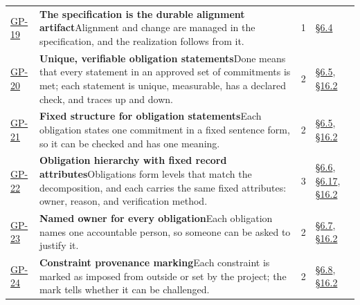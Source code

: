 \begin{longtable}{@{}p{} p{} r p{}@{}}
\hyperlink{gp-19}{GP-19}\hypertarget{gp-19}{} & \textbf{The specification is the durable alignment artifact}\newline Alignment and change are managed in the specification, and the realization follows from it.\rule[-\normalbaselineskip]{0pt}{0pt} & 1 & \hyperlink{nss-6.4}{\S6.4}\rule[-\normalbaselineskip]{0pt}{0pt} \\
\hyperlink{gp-20}{GP-20}\hypertarget{gp-20}{} & \textbf{Unique, verifiable obligation statements}\newline Done means that every statement in an approved set of commitments is met; each statement is unique, measurable, has a declared check, and traces up and down.\rule[-\normalbaselineskip]{0pt}{0pt} & 2 & \hyperlink{nss-6.5}{\S6.5}, \hyperlink{nss-16.2}{\S16.2}\rule[-\normalbaselineskip]{0pt}{0pt} \\
\hyperlink{gp-21}{GP-21}\hypertarget{gp-21}{} & \textbf{Fixed structure for obligation statements}\newline Each obligation states one commitment in a fixed sentence form, so it can be checked and has one meaning.\rule[-\normalbaselineskip]{0pt}{0pt} & 2 & \hyperlink{nss-6.5}{\S6.5}, \hyperlink{nss-16.2}{\S16.2}\rule[-\normalbaselineskip]{0pt}{0pt} \\
\hyperlink{gp-22}{GP-22}\hypertarget{gp-22}{} & \textbf{Obligation hierarchy with fixed record attributes}\newline Obligations form levels that match the decomposition, and each carries the same fixed attributes: owner, reason, and verification method.\rule[-\normalbaselineskip]{0pt}{0pt} & 3 & \hyperlink{nss-6.6}{\S6.6}, \hyperlink{nss-6.17}{\S6.17}, \hyperlink{nss-16.2}{\S16.2}\rule[-\normalbaselineskip]{0pt}{0pt} \\
\hyperlink{gp-23}{GP-23}\hypertarget{gp-23}{} & \textbf{Named owner for every obligation}\newline Each obligation names one accountable person, so someone can be asked to justify it.\rule[-\normalbaselineskip]{0pt}{0pt} & 2 & \hyperlink{nss-6.7}{\S6.7}, \hyperlink{nss-16.2}{\S16.2}\rule[-\normalbaselineskip]{0pt}{0pt} \\
\hyperlink{gp-24}{GP-24}\hypertarget{gp-24}{} & \textbf{Constraint provenance marking}\newline Each constraint is marked as imposed from outside or set by the project; the mark tells whether it can be challenged.\rule[-\normalbaselineskip]{0pt}{0pt} & 2 & \hyperlink{nss-6.8}{\S6.8}, \hyperlink{nss-16.2}{\S16.2}\rule[-\normalbaselineskip]{0pt}{0pt} \\

\end{longtable}
